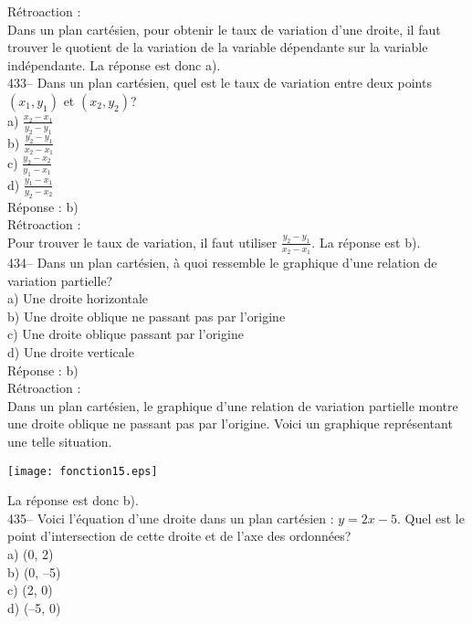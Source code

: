 ﻿\documentclass[letterpaper, 12pt]{article}
\begin{document}
R\'etroaction : \\
Dans un plan cart\'esien, pour obtenir le taux de variation d'une droite, il
faut trouver le quotient de la variation de la variable d\'ependante sur la
variable ind\'ependante.  La r\'eponse est donc a).\\

433-- Dans un plan cart\'esien, quel est le taux de variation entre deux
points $\left( x_1,y_1\right)$ et $\left( x_2,y_2\right) $?\\
a) $\frac{x_2-x_1}{y_2-y_1}$\\[2mm]
b) $\frac{y_2-y_1}{x_2-x_1}$\\[2mm]
c) $\frac{y_2-x_2}{y_1-x_1}$\\[2mm]
d) $\frac{y_1-x_1}{y_2-x_2}$\\[2mm]

R\'eponse :  b)\\

R\'etroaction : \\
Pour trouver le taux de variation, il faut utiliser
$\frac{y_2-y_1}{x_2-x_1}$.  La r\'eponse est b).\\

434--  Dans un plan cart\'esien, \`a quoi ressemble le graphique d'une
relation de variation partielle?\\
a) Une droite horizontale\\
b) Une droite oblique ne passant pas par l'origine\\
c) Une droite oblique passant par l'origine\\
d) Une droite verticale\\

R\'eponse :  b)\\

R\'etroaction : \\
Dans un plan cart\'esien, le graphique d'une relation de variation partielle
montre une droite oblique ne passant pas par l'origine.  Voici un graphique
repr\'esentant une telle situation.\\
    \begin{center}
    \texttt{[image: fonction15.eps]}
    \end{center}

La r\'eponse est donc b).\\

435-- Voici l'\'equation d'une droite dans un plan cart\'esien : $y=2x-5$.
Quel est le point d'intersection de cette droite et de l'axe des
ordonn\'ees?\\
a) (0, 2)\\
b) (0, --5)\\
c) (2, 0)\\
d) (--5, 0)\\
\end{document}
